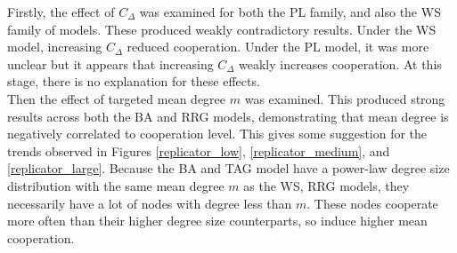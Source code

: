 Firstly, the effect of $C_\Delta$ was examined for both the PL family, and also the WS family of models. These produced weakly contradictory results. Under the WS model, increasing $C_\Delta$ reduced cooperation. Under the PL model, it was more unclear but it appears that increasing $C_\Delta$ weakly increases cooperation. At this stage, there is no explanation for these effects. \\

Then the effect of targeted mean degree $m$ was examined. This produced strong results across both the BA and RRG models, demonstrating that mean degree is negatively correlated to cooperation level. This gives some suggestion for the trends observed in Figures \ref{replicator_low}, \ref{replicator_medium}, and \ref{replicator_large}. Because the BA and TAG model have a power-law degree size distribution with the same mean degree $m$ as the WS, RRG models, they necessarily have a lot of nodes with degree less than $m$. These nodes cooperate more often than their higher degree size counterparts, so induce higher mean cooperation. 
